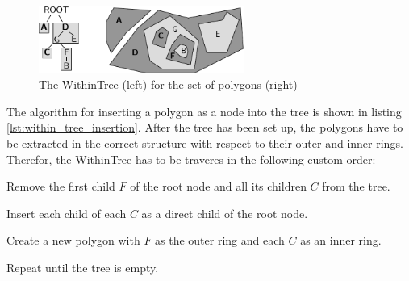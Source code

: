 \begin{figure}[ht]
  \vspace{1em}
  \centering
  \includegraphics[width=0.6\textwidth]{graphics/development/implementation/within_tree}
  \caption{The WithinTree (left) for the set of polygons (right)}
  \label{fig:within_tree}
\end{figure}

The algorithm for inserting a polygon as a node into the tree is shown in listing \ref{lst:within_tree_insertion}. After the tree has been set up, the
polygons have to be extracted in the correct structure with respect to their outer and inner rings. Therefor, the WithinTree has to be traveres in the following custom order:

\begin{compactenum}
  \item Remove the first child $F$ of the root node and all its children $C$ from the tree.
  \item Insert each child of each $C$ as a direct child of the root node.
  \item Create a new polygon with $F$ as the outer ring and each $C$ as an inner ring.
  \item Repeat until the tree is empty.
\end{compactenum}



